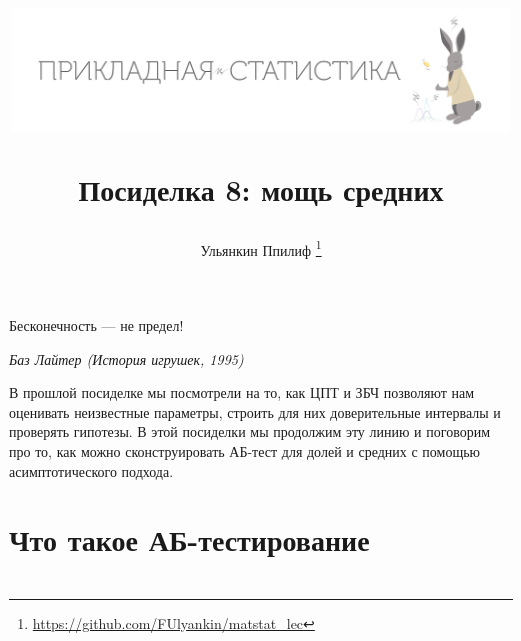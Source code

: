\documentclass[12pt, a4paper, oneside]{article}
\title{
\begin{center} 
\includegraphics[width=0.99\textwidth]{logo.png}
\end{center}

Посиделка 8: мощь средних}
\date{ } %
\author{Ульянкин Ппилиф \thanks{\url{https://github.com/FUlyankin/matstat_lec}}}
\begin{document}

\maketitle

\epigraph{\hfill Бесконечность --- не предел!}{\textit{Баз Лайтер (История игрушек, 1995)}}

В прошлой посиделке мы посмотрели на то, как ЦПТ и ЗБЧ позволяют нам оценивать неизвестные параметры, строить для них доверительные интервалы и проверять гипотезы. В этой посиделки мы продолжим эту линию и поговорим про то, как можно сконструировать АБ-тест для долей и средних с помощью асимптотического подхода.

\section{Что такое АБ-тестирование}







\section{ }







\end{document}

